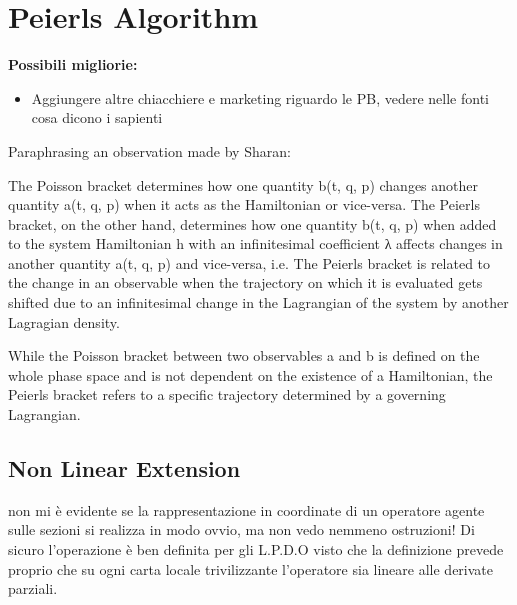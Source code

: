 \documentclass[Main]{subfiles}
\begin{document}
	\section{Peierls Algorithm}
		\begin{Warning}
			\textbf{Possibili migliorie:}
				\begin{itemize}
					\item Aggiungere altre chiacchiere e marketing riguardo le  PB, vedere nelle fonti cosa dicono i sapienti
					\end{itemize}
		\end{Warning}
			\begin{observation}
		\begin{Warning}
	Paraphrasing an observation made by Sharan\cite{Sharan2010}:
	
	The Poisson bracket determines how one quantity b(t, q, p) changes another quantity a(t, q, p) when it acts as the Hamiltonian or vice-versa. The Peierls bracket, on the other hand, determines how one quantity b(t, q, p) when added to the system Hamiltonian h with an infinitesimal coefficient λ affects changes in another quantity a(t, q, p) and vice-versa, i.e. 	The Peierls bracket is related to the change in an observable when the trajectory on which it is evaluated gets shifted due to an infinitesimal change in the Lagrangian of the system by another Lagragian density.
		
	While the Poisson bracket between two observables a and b is defined on the whole phase space and is not dependent on the existence of a Hamiltonian, the Peierls bracket refers to a specific trajectory determined by a governing Lagrangian. 
	
	\end{Warning}
	\end{observation}	
	
	\subsection{Non Linear Extension}
		non mi è evidente se la rappresentazione in coordinate di un operatore agente sulle sezioni si realizza in modo ovvio, ma non vedo nemmeno ostruzioni! Di sicuro l'operazione è ben definita per gli L.P.D.O visto che la definizione prevede proprio che su ogni carta locale trivilizzante l'operatore sia lineare alle derivate parziali.

	\danger \danger \danger \danger 	\danger \danger \danger \danger 	\danger \danger \danger \danger 
\end{document}
